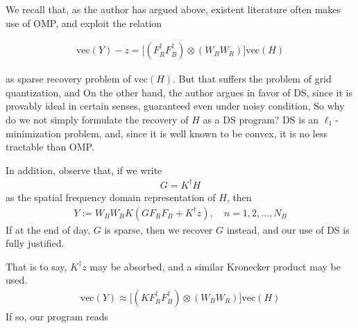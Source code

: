 \documentclass[12pt]{article}
\begin{document}
We recall that, as the author has argued above, existent literature often makes use of OMP, and exploit the relation

\begin{gather}
\mathrm{vec}(Y) -z
=\big[ (F_R^\dagger F_B^\dagger) \otimes (W_B W_R) \big] \mathrm{vec}(H)
\end{gather}

as sparse recovery problem of \(\mathrm{vec}(H)\).
But that suffers the problem of grid quantization, and 
On the other hand, the author argues in favor of DS, since it is provably ideal in certain senses, guaranteed even under noisy condition,
So why do we not simply formulate the recovery of \(H\) as a DS program?
DS is an \(\ell_1\)-minimization problem, and, since it is well known to be convex, it is no less tractable than OMP.

In addition, observe that, if we write
\begin{gather}
G =K^\dagger H
\end{gather}
as the spatial frequency domain representation of \(H\), then
\begin{gather}
Y
:=W_B W_R K ( G F_R F_B +K^\dagger z ), \quad
n =1, 2, \dotsc, N_B
\end{gather}
If at the end of day, \(G\) is sparse, then we recover \(G\) instead, and our use of DS is fully justified.

That is to say, \(K^\dagger z\) may be absorbed, and a similar Kronecker product may be used.
\begin{gather}
\mathrm{vec}(Y)
\approx \big[ (K F_R^\dagger F_B^\dagger) \otimes (W_B W_R) \big] \mathrm{vec}(H)
\end{gather}
If so, our program reads
\end{document}

